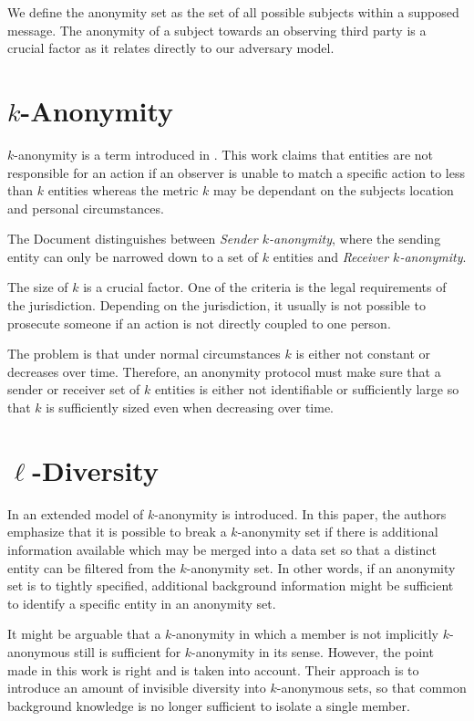 We define the anonymity set as the set of all possible subjects within a supposed message. The anonymity of a subject towards an observing third party is a crucial factor as it relates directly to our adversary model.

\section{\texorpdfstring{$k$}{k}-Anonymity}
$k$-anonymity is a term introduced in \cite{k-anonymous:ccs2003}. This work claims that entities are not responsible for an action if an observer is unable to match a specific action to less than $k$ entities whereas the metric $k$ may be dependant on the subjects location and personal circumstances.

The Document distinguishes between \textit{Sender $k$-anonymity}, where the sending entity can only be narrowed down to a set of $k$ entities and \textit{Receiver $k$-anonymity}. 

The size of $k$ is a crucial factor. One of the criteria is the legal requirements of the jurisdiction. Depending on the jurisdiction, it usually is not possible to prosecute someone if an action is not directly coupled to one person. 

The problem is that under normal circumstances $k$ is either not constant or decreases over time. Therefore, an anonymity protocol must make sure that a sender or receiver set of $k$ entities is either not identifiable or sufficiently large so that $k$ is sufficiently sized even when decreasing over time.

\section{\texorpdfstring{$\ell$}{l}-Diversity}
In \cite{machanavajjhala2007diversity} an extended model of $k$-anonymity is introduced. In this paper, the authors emphasize that it is possible to break a $k$-anonymity set if there is additional information available which may be merged into a data set so that a distinct entity can be filtered from the $k$-anonymity set. In other words, if an anonymity set is to tightly specified, additional background information might be sufficient to identify a specific entity in an anonymity set.

It might be arguable that a $k$-anonymity in which a member is not implicitly $k$-anonymous still is sufficient for $k$-anonymity in its sense. However, the point made in this work is right and is taken into account. Their approach is to introduce an amount of invisible diversity into $k$-anonymous sets, so that common background knowledge is no longer sufficient to isolate a single member.

